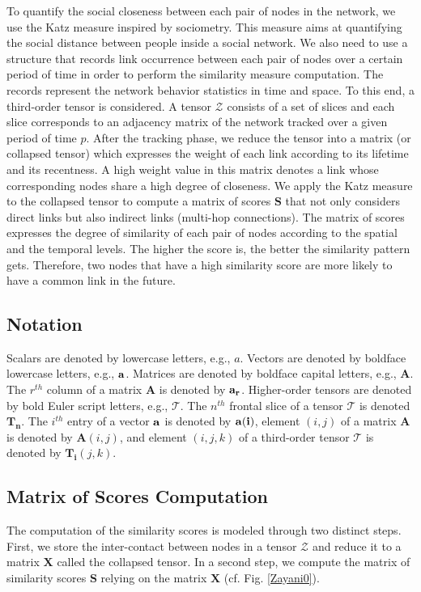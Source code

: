 \documentclass[conference]{IEEEtran}
\begin{document}
To quantify the social closeness between each pair of nodes in the
network, we use the Katz measure \cite{Katz1953} inspired by
sociometry. This measure aims at quantifying the social distance
between people inside a social network. We also need to use a
structure that records link occurrence between each pair of nodes
over a certain period of time in order to perform the similarity
measure computation. The records represent the network behavior
statistics in time and space. To this end, a third-order tensor is
considered. A tensor $\boldsymbol{\mathcal{Z}}$ consists of a set of
slices and each slice corresponds to an adjacency matrix of the
network tracked over a given period of time $p$. After the tracking
phase, we reduce the tensor into a matrix (or collapsed tensor)
which expresses the weight of each link according to its lifetime
and its recentness. A high weight value in this matrix denotes a
link whose corresponding nodes share a high degree of closeness. We
apply the Katz measure to the collapsed tensor to compute a matrix
of scores $\mathbf{S}$ that not only considers direct links but also
indirect links (multi-hop connections). The matrix of scores
expresses the degree of similarity of each pair of nodes according
to the spatial and the temporal levels. The higher the score is, the
better the similarity pattern gets. Therefore, two nodes that have a
high similarity score are more likely to have a common link in the
future.

\subsection{Notation}
Scalars are denoted by lowercase letters, e.g., $a$. Vectors are
denoted by boldface lowercase letters, e.g., $\bf{a}$. Matrices are
denoted by boldface capital letters, e.g., $\mathbf{A}$. The
$r^{th}$ column of a matrix $\mathbf{A}$ is denoted by $\bf{a_r}$.
Higher-order tensors are denoted by bold Euler script letters, e.g.,
$\boldsymbol{\mathcal{T}}$. The $n^{th}$ frontal slice of a tensor
$\boldsymbol{\mathcal{T}}$ is denoted $\mathbf{T_n}$. The $i^{th}$
entry of a vector $\bf{a}$ is denoted by $\bf{a}(i)$, element
$(i,j)$ of a matrix $\mathbf{A}$ is denoted by $\mathbf{A}(i,j)$,
and element $(i, j, k)$ of a third-order tensor
$\boldsymbol{\mathcal{T}}$ is denoted by $\mathbf{T_{i}}(j, k)$.

\subsection{Matrix of Scores Computation}
The computation of the similarity scores is modeled through two
distinct steps. First, we store the inter-contact between nodes in a
tensor $\boldsymbol{\mathcal{Z}}$ and reduce it to a matrix
$\mathbf{X}$ called the collapsed tensor. In a second step, we
compute the matrix of similarity scores $\mathbf{S}$ relying on the
matrix $\mathbf{X}$ (cf. Fig. \ref{Zayani0}).
\end{document}
